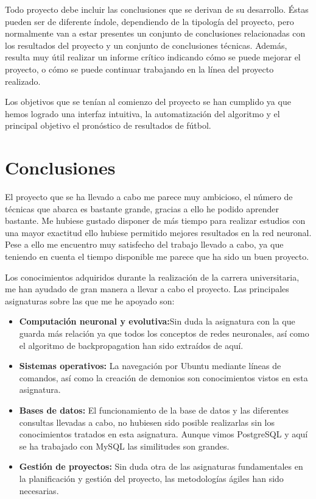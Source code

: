 
Todo proyecto debe incluir las conclusiones que se derivan de su desarrollo. Éstas pueden ser de diferente índole, dependiendo de la tipología del proyecto, pero normalmente van a estar presentes un conjunto de conclusiones relacionadas con los resultados del proyecto y un conjunto de conclusiones técnicas. 
Además, resulta muy útil realizar un informe crítico indicando cómo se puede mejorar el proyecto, o cómo se puede continuar trabajando en la línea del proyecto realizado. 

Los objetivos que se tenían al comienzo del proyecto se han cumplido ya que hemos logrado una interfaz intuitiva, la automatización del algoritmo y el principal objetivo el pronóstico de resultados de fútbol.

\section{Conclusiones}

El proyecto que se ha llevado a cabo me parece muy ambicioso, el número de técnicas que abarca es bastante grande, gracias a ello he podido aprender bastante.
Me hubiese gustado disponer de más tiempo para realizar estudios con una mayor exactitud ello hubiese permitido mejores resultados en la red neuronal. Pese a ello me encuentro muy satisfecho del trabajo llevado a cabo, ya que teniendo en cuenta el tiempo disponible me parece que ha sido un buen proyecto.

Los conocimientos adquiridos durante la realización de la carrera universitaria, me han ayudado de gran manera a llevar a cabo el proyecto. Las principales asignaturas sobre las que me he apoyado son:

\begin{itemize}
\item \textbf{Computación neuronal y evolutiva:}Sin duda la asignatura con la que guarda más relación ya que todos los conceptos de redes neuronales, así como el algoritmo de backpropagation han sido extraídos de aquí.

\item \textbf{Sistemas operativos: } La navegación por Ubuntu mediante líneas de comandos, así como la creación de demonios son conocimientos vistos en esta asignatura.

\item \textbf{Bases de datos: }El funcionamiento de la base de datos y las diferentes consultas llevadas a cabo, no hubiesen sido posible realizarlas sin los conocimientos tratados en esta asignatura. Aunque vimos PostgreSQL y aquí se ha trabajado con MySQL las similitudes son grandes.

\item \textbf{Gestión de proyectos: } Sin duda otra de las asignaturas fundamentales en la planificación y gestión del proyecto, las metodologías ágiles han sido necesarias.

\end{itemize}

